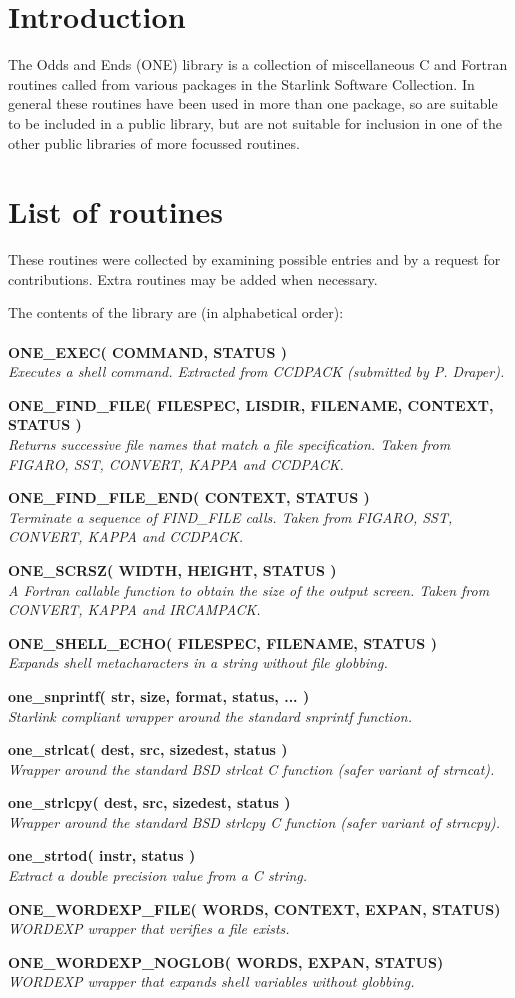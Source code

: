 \documentclass[twoside,11pt]{starlink}
\providecommand{\noteroutine}[2]{\textbf{#1}\hspace*{\fill}\nopagebreak \\
                             \hspace*{3em}\emph{#2}\hspace*{\fill}\par}
\begin{document}
\scfrontmatter

\section{Introduction}
The Odds and Ends  (ONE) library is a collection of
miscellaneous C and Fortran routines called from various packages
in the Starlink Software Collection.
In general these routines have been used in more than one package,
so are suitable to be included in a public library,
but are not suitable for inclusion in one of the other
public libraries of more focussed routines.
\section{List of routines}
These routines were collected by examining possible entries and
by a request for contributions.
Extra routines may be added when necessary.

The contents of the library are (in alphabetical order):\\
\\
\noteroutine{ONE\_EXEC( COMMAND, STATUS )}
    {Executes a shell command.
    Extracted from CCDPACK (submitted by P. Draper).}
\noteroutine{ONE\_FIND\_FILE( FILESPEC, LISDIR, FILENAME, CONTEXT, STATUS )}
    {Returns successive file names that match a file specification.
    Taken from FIGARO, SST, CONVERT, KAPPA and CCDPACK.}
\noteroutine{ONE\_FIND\_FILE\_END( CONTEXT, STATUS )}
    {Terminate a sequence of FIND\_FILE calls.
    Taken from FIGARO, SST, CONVERT, KAPPA and CCDPACK.}
\noteroutine{ONE\_SCRSZ( WIDTH, HEIGHT, STATUS )}
    {A Fortran callable function to obtain the size of the output screen.
    Taken from CONVERT, KAPPA and IRCAMPACK.}
\noteroutine{ONE\_SHELL\_ECHO( FILESPEC, FILENAME, STATUS )}
    {Expands shell metacharacters in a string without file globbing.}
\noteroutine{one\_snprintf( str, size, format, status, ... )}
    {Starlink compliant wrapper around the standard snprintf function.}
\noteroutine{one\_strlcat( dest, src, sizedest, status )}
    {Wrapper around the standard BSD strlcat C function (safer variant
      of strncat).}
\noteroutine{one\_strlcpy( dest, src, sizedest, status )}
   {Wrapper around the standard BSD strlcpy C function (safer variant of strncpy).}
\noteroutine{one\_strtod( instr, status )}
   {Extract a double precision value from a C string.}
\noteroutine{ONE\_WORDEXP\_FILE( WORDS, CONTEXT, EXPAN, STATUS)}
  {WORDEXP wrapper that verifies a file exists.}
\noteroutine{ONE\_WORDEXP\_NOGLOB( WORDS, EXPAN, STATUS)}
  {WORDEXP wrapper that expands shell variables without globbing.}
\end{document}
